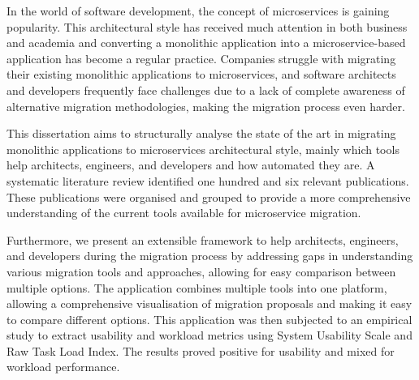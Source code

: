 In the world of software development, the concept of microservices is gaining
popularity. This architectural style has received much attention in both
business and academia and converting a monolithic application into a
microservice-based application has become a regular practice. Companies
struggle with migrating their existing monolithic applications to
microservices, and software architects and developers frequently face
challenges due to a lack of complete awareness of alternative migration
methodologies, making the migration process even harder.

This dissertation aims to structurally analyse the state of the art in
migrating monolithic applications to microservices architectural style, mainly
which tools help architects, engineers, and developers and how automated they
are. A systematic literature review identified one hundred and six relevant
publications. These publications were organised and grouped to provide a more
comprehensive understanding of the current tools available for microservice
migration.

Furthermore, we present an extensible framework to help architects,
engineers, and developers during the migration process by addressing gaps in
understanding various migration tools and approaches, allowing for easy
comparison between multiple options. The application combines multiple tools
into one platform, allowing a comprehensive visualisation of migration
proposals and making it easy to compare different options. This application was
then subjected to an empirical study to extract usability and workload metrics
using System Usability Scale and Raw Task Load Index. The results proved
positive for usability and mixed for workload performance.

